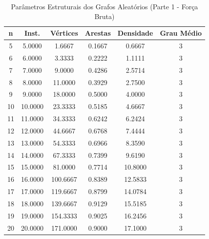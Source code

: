 \begin{table}[H]
\centering
\caption{Parâmetros Estruturais dos Grafos Aleatórios (Parte 1 - Força Bruta)}
\label{tab:parametros_grafos_2}
\begin{tabular}{cccccc}
\toprule
n & Inst. & Vértices & Arestas & Densidade & Grau Médio \\
\midrule
5 & 5.0000 & 1.6667 & 0.1667 & 0.6667 & 3 \\
6 & 6.0000 & 3.3333 & 0.2222 & 1.1111 & 3 \\
7 & 7.0000 & 9.0000 & 0.4286 & 2.5714 & 3 \\
8 & 8.0000 & 11.0000 & 0.3929 & 2.7500 & 3 \\
9 & 9.0000 & 18.0000 & 0.5000 & 4.0000 & 3 \\
10 & 10.0000 & 23.3333 & 0.5185 & 4.6667 & 3 \\
11 & 11.0000 & 34.3333 & 0.6242 & 6.2424 & 3 \\
12 & 12.0000 & 44.6667 & 0.6768 & 7.4444 & 3 \\
13 & 13.0000 & 54.3333 & 0.6966 & 8.3590 & 3 \\
14 & 14.0000 & 67.3333 & 0.7399 & 9.6190 & 3 \\
15 & 15.0000 & 81.0000 & 0.7714 & 10.8000 & 3 \\
16 & 16.0000 & 100.6667 & 0.8389 & 12.5833 & 3 \\
17 & 17.0000 & 119.6667 & 0.8799 & 14.0784 & 3 \\
18 & 18.0000 & 139.6667 & 0.9129 & 15.5185 & 3 \\
19 & 19.0000 & 154.3333 & 0.9025 & 16.2456 & 3 \\
20 & 20.0000 & 171.0000 & 0.9000 & 17.1000 & 3 \\
\bottomrule
\end{tabular}
\end{table}
